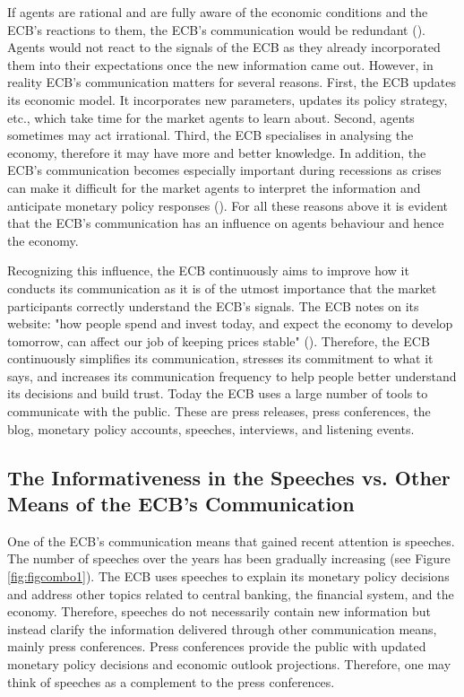 If agents are rational and are fully aware of the economic conditions and the ECB's reactions to them, the ECB's communication would be redundant (\cite{woodford2005}). Agents would not react to the signals of the ECB as they already incorporated them into their expectations once the new information came out. However, in reality ECB's communication matters for several reasons. First, the ECB updates its economic model. It incorporates new parameters, updates its policy strategy, etc.,  which take time for the market agents to learn about. Second, agents sometimes may act irrational. Third, the ECB specialises in analysing the economy, therefore it may have more and better knowledge. In addition, the ECB's communication becomes especially important during recessions as crises can make it difficult for the market agents to interpret the information and anticipate monetary policy responses (\cite{coenen2017}). For all these reasons above it is evident that the ECB's communication has an influence on agents behaviour and hence the economy. 

Recognizing this influence, the ECB continuously aims to improve how it conducts its communication as it is of the utmost importance that the market participants correctly understand the ECB's signals. The ECB notes on its website: "how people spend and invest today, and expect the economy to develop tomorrow, can affect our job of keeping prices stable" (\cite{europeancentralbank2021}). Therefore, the ECB continuously simplifies its communication, stresses its commitment to what it says, and increases its communication frequency to help people better understand its decisions and build trust. Today the ECB uses a large number of tools to communicate with the public. These are press releases, press conferences, the blog, monetary policy accounts, speeches, interviews, and listening events. 

\subsection{The Informativeness in the Speeches vs. Other Means of the ECB's Communication}


One of the ECB's communication means that gained recent attention is speeches. The number of speeches over the years has been gradually increasing (see Figure \ref{fig:figcombo1}). The ECB uses speeches to explain its monetary policy decisions and address other topics related to central banking, the financial system, and the economy. Therefore, speeches do not necessarily contain new information but instead clarify the information delivered through other communication means, mainly press conferences. Press conferences provide the public with updated monetary policy decisions and economic outlook projections. Therefore, one may think of speeches as a complement to the press conferences. 

